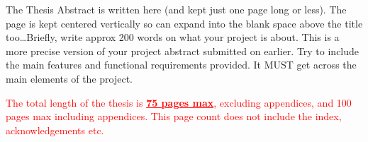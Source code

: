 The Thesis Abstract is written here (and kept just one page long or less). The page is kept centered vertically so can expand into the blank space above the title too\ldots Briefly, write approx 200 words on what your project is about. This is a more precise version of your project abstract submitted on earlier. Try to include the main features and functional requirements provided. It MUST get across the main elements of the project.

\textcolor{red}{The total length of the thesis is \textbf{\underline{75 pages max}}, excluding appendices, and 100 pages max including appendices. This page count does not include the index, acknowledgements etc.}